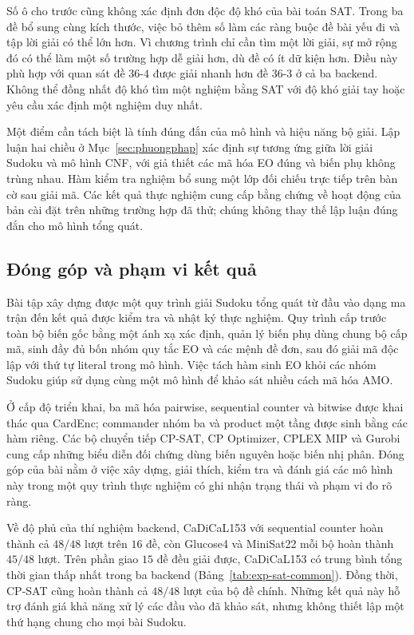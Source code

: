 \documentclass[a4paper,fleqn]{cas-sc}
\begin{document}
Số ô cho trước cũng không xác định đơn độc độ khó của bài toán SAT.
Trong ba đề bổ sung cùng kích thước, việc bỏ thêm số làm các ràng buộc
đề bài yếu đi và tập lời giải có thể lớn hơn. Vì chương trình chỉ cần
tìm một lời giải, sự mở rộng đó có thể làm một số trường hợp dễ giải
hơn, dù đề có ít dữ kiện hơn. Điều này phù hợp với quan sát đề
$36$-$4$ được giải nhanh hơn đề $36$-$3$ ở cả ba backend. Không thể
đồng nhất độ khó tìm một nghiệm bằng SAT với độ khó giải tay hoặc yêu
cầu xác định một nghiệm duy nhất.

Một điểm cần tách biệt là tính đúng đắn của mô hình và hiệu năng bộ
giải. Lập luận hai chiều ở Mục~\ref{sec:phuongphap} xác định sự tương
ứng giữa lời giải Sudoku và mô hình CNF, với giả thiết các mã hóa EO
đúng và biến phụ không trùng nhau. Hàm kiểm tra nghiệm bổ sung một lớp
đối chiếu trực tiếp trên bàn cờ sau giải mã. Các kết quả thực nghiệm
cung cấp bằng chứng về hoạt động của bản cài đặt trên những trường hợp
đã thử; chúng không thay thế lập luận đúng đắn cho mô hình tổng quát.

\subsection{Đóng góp và phạm vi kết quả}

Bài tập xây dựng được một quy trình giải Sudoku tổng quát từ đầu vào
dạng ma trận đến kết quả được kiểm tra và nhật ký thực nghiệm. Quy
trình cấp trước toàn bộ biến gốc bằng một ánh xạ xác định, quản lý biến
phụ dùng chung bộ cấp mã, sinh đầy đủ bốn nhóm quy tắc EO và các mệnh
đề đơn, sau đó giải mã độc lập với thứ tự literal trong mô hình.
Việc tách hàm sinh EO khỏi các nhóm Sudoku giúp sử dụng cùng một mô
hình để khảo sát nhiều cách mã hóa AMO.

Ở cấp độ triển khai, ba mã hóa pairwise, sequential counter và bitwise
được khai thác qua CardEnc; commander nhóm ba và product một tầng
được sinh bằng các hàm riêng. Các bộ chuyển tiếp CP-SAT, CP Optimizer,
CPLEX MIP và Gurobi cung cấp những biểu diễn đối chứng dùng biến nguyên
hoặc biến nhị phân. Đóng góp của bài nằm ở việc xây dựng, giải thích,
kiểm tra và đánh giá các mô hình này trong một quy trình thực nghiệm
có ghi nhận trạng thái và phạm vi đo rõ ràng.

Về độ phủ của thí nghiệm backend, CaDiCaL153 với sequential counter
hoàn thành cả $48/48$ lượt trên $16$ đề, còn Glucose4 và MiniSat22 mỗi
bộ hoàn thành $45/48$ lượt. Trên phần giao $15$ đề đều giải được,
CaDiCaL153 có trung bình tổng thời gian thấp nhất trong ba backend
(Bảng~\ref{tab:exp-sat-common}). Đồng thời, CP-SAT cũng hoàn thành
cả $48/48$ lượt của bộ đề chính. Những kết quả này hỗ trợ đánh giá
khả năng xử lý các đầu vào đã khảo sát, nhưng không thiết lập một thứ
hạng chung cho mọi bài Sudoku.
\end{document}
